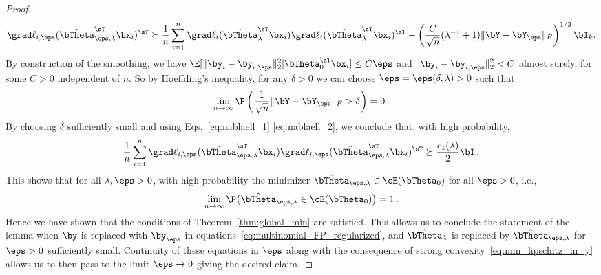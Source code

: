 \begin{proof}
\begin{equation}
    \grad\ell_{i,\eps}(\hat\bTheta_{\eps,\lambda}^\sT\bx_i)^\sT  \succeq
    \frac1n\sum_{i=1}^n \grad\ell_{i}(\hat\bTheta_{\lambda}^\sT\bx_i)
    \grad\ell_{i}(\hat\bTheta_{\lambda}^\sT\bx_i)^\sT -  \left(\frac{C}{\sqrt{n}}(\lambda^{-1} + 1) \| \bY - \bY_{\eps}\|_F\right)^{1/2} \bI_k.
\end{equation}
%
By construction of the smoothing, we have
    $\E[\|\by_i - \by_{i,\eps}\|_2^2 | \bTheta_0^\sT\bx_i] \le C \eps$
and $\|\by_i - \by_{i,\eps}\|_2^2 < C$ almost surely, for some $C >0$ independent of $n$. So by Hoeffding's inequality, for any $\delta> 0$ we can choose $\eps = \eps(\delta,\lambda)>0$
such that
\begin{equation}
    \lim_{n\to\infty }\P\left(\frac1{\sqrt{n}} \|\bY - \bY_\eps\|_F > \delta\right) =0\, .
\end{equation}
%
By choosing $\delta$ sufficiently small and using Eqs.~\eqref{eq:nablaell_1} 
\eqref{eq:nablaell_2}, we conclude that, with high probability,
\begin{equation}
    \frac1n\sum_{i=1}^n \grad\ell_{i,\eps}(\hat\bTheta_{\eps,\lambda}^\sT\bx_i) 
    \grad\ell_{i,\eps}(\hat\bTheta_{\eps,\lambda}^\sT\bx_i)^\sT
    \succeq \frac{c_1(\lambda)}{2}\bI\, .
\end{equation}
This shows that for all $\lambda,\eps >0$, with high probability  the minimizer $\hat\bTheta_{\eps,\lambda} \in \cE(\bTheta_0)$ for all $\eps >0$, i.e.,
\begin{equation}
\lim_{n\to\infty}\P\big(\hat\bTheta_{\eps,\lambda} \in \cE(\bTheta_0) \big) = 1\,.
\end{equation}
Hence we have shown that the conditions of Theorem~\ref{thm:global_min} are satisfied.
This allows us to conclude the statement of the lemma when $\by$ is replaced with $\by_{\eps}$ in equations~\eqref{eq:multinomial_FP_regularized}, and $\hat\bTheta_{\lambda}$ is replaced by $\hat\bTheta_{\eps,\lambda}$ for $\eps >0$ sufficiently small.
Continuity of these equations in $\eps$ along with the consequence of strong convexity~\eqref{eq:min_lipschitz_in_y} allows us to then pass to the limit $\eps\to 0$ giving the desired claim.
\end{proof}

